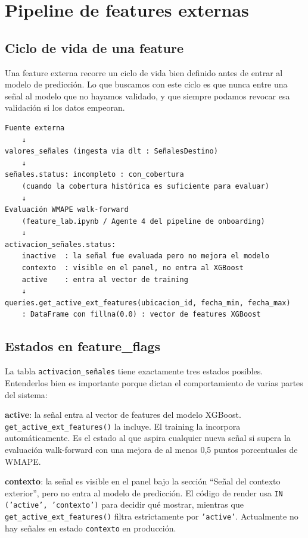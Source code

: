 \documentclass[12pt, a4paper]{article}
\begin{document}
\section{Pipeline de features externas}

\subsection{Ciclo de vida de una feature}

Una feature externa recorre un ciclo de vida bien definido antes de entrar al modelo de predicción. Lo que buscamos con este ciclo es que nunca entre una señal al modelo que no hayamos validado, y que siempre podamos revocar esa validación si los datos empeoran.

\begin{verbatim}
Fuente externa
    ↓
valores_señales (ingesta via dlt : SeñalesDestino)
    ↓
señales.status: incompleto : con_cobertura
    (cuando la cobertura histórica es suficiente para evaluar)
    ↓
Evaluación WMAPE walk-forward
    (feature_lab.ipynb / Agente 4 del pipeline de onboarding)
    ↓
activacion_señales.status:
    inactive  : la señal fue evaluada pero no mejora el modelo
    contexto  : visible en el panel, no entra al XGBoost
    active    : entra al vector de training
    ↓
queries.get_active_ext_features(ubicacion_id, fecha_min, fecha_max)
    : DataFrame con fillna(0.0) : vector de features XGBoost
\end{verbatim}

\subsection{Estados en feature\_flags}

La tabla \texttt{activacion\_señales} tiene exactamente tres estados posibles. Entenderlos bien es importante porque dictan el comportamiento de varias partes del sistema:

\textbf{active}: la señal entra al vector de features del modelo XGBoost. \texttt{get\_active\_ext\_features()} la incluye. El training la incorpora automáticamente. Es el estado al que aspira cualquier nueva señal si supera la evaluación walk-forward con una mejora de al menos 0,5 puntos porcentuales de WMAPE.

\textbf{contexto}: la señal es visible en el panel bajo la sección ``Señal del contexto exterior'', pero no entra al modelo de predicción. El código de render usa \texttt{IN ('active', 'contexto')} para decidir qué mostrar, mientras que \texttt{get\_active\_ext\_features()} filtra estrictamente por \texttt{'active'}. Actualmente no hay señales en estado \texttt{contexto} en producción.
\end{document}
